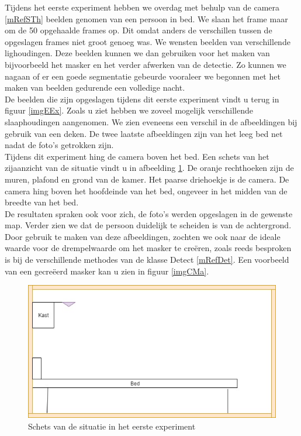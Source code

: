 Tijdens het eerste experiment hebben we overdag met behulp van de camera \ref{mRefSTh} beelden genomen van een persoon in bed. We slaan het frame maar om de 50 opgehaalde frames op. Dit omdat anders de verschillen tussen de opgeslagen frames niet groot genoeg was. We wensten beelden van verschillende lighoudingen.  Deze beelden kunnen we dan gebruiken voor het maken van bijvoorbeeld het masker en het verder afwerken van de detectie. Zo kunnen we nagaan of er een goede segmentatie gebeurde vooraleer we begonnen met het maken van beelden gedurende een volledige nacht.\\
De beelden die zijn opgeslagen tijdens dit eerste experiment vindt u terug in figuur \ref{imgEEx}. Zoals u ziet hebben we zoveel mogelijk verschillende slaaphoudingen aangenomen. We zien eveneens een verschil in de afbeeldingen bij gebruik van een deken. De twee laatste afbeeldingen zijn van het leeg bed net nadat de foto's getrokken zijn. \\
Tijdens dit experiment hing de camera boven het bed. Een schets van het zijaanzicht van de situatie vindt u in afbeelding \ref{imgEEx2}. De oranje rechthoeken zijn de muren, plafond en grond van de kamer. Het paarse driehoekje is de camera. De camera hing boven het hoofdeinde van het bed, ongeveer in het midden van de breedte van het bed. \\
De resultaten spraken ook voor zich, de foto's werden opgeslagen in de gewenste map. Verder zien we dat de persoon duidelijk te scheiden is van de achtergrond. Door gebruik te maken van deze afbeeldingen, zochten we ook naar de ideale waarde voor de drempelwaarde om het masker te cre\"eren, zoals reeds besproken is bij de verschillende methodes van de klasse Detect \ref{mRefDet}. Een voorbeeld van een gecre\"eerd masker kan u zien in figuur \ref{imgCMa}.
\begin{figure}[hbp]
	\includegraphics[scale=0.5]{SchetsExperiment1}
	\caption{Schets van de situatie in het eerste experiment}
	\label{imgEEx2}
\end{figure}


